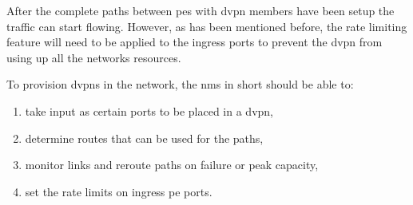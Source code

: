 After the complete paths between \acp{pe} with \ac{dvpn} members have been setup the traffic can start flowing. However, as has been mentioned before, the rate limiting feature will need to be applied to the ingress ports to prevent the \ac{dvpn} from using up all the networks resources. 

To provision \acp{dvpn} in the network, the \ac{nms} in short should be able to:

\begin{enumerate}
	\item take input as certain ports to be placed in a \ac{dvpn},
	\item determine routes that can be used for the paths,
	\item monitor links and reroute paths on failure or peak capacity,
	\item set the rate limits on ingress \ac{pe} ports.
\end{enumerate}



